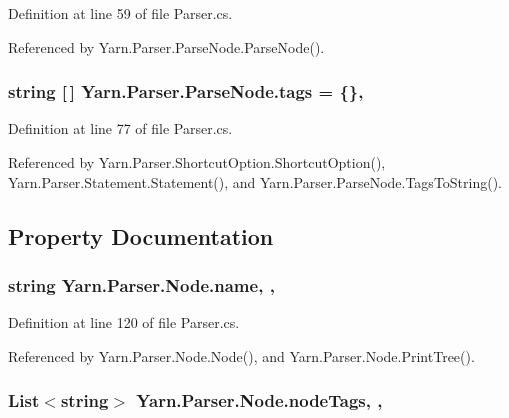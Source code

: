 Definition at line 59 of file Parser.\-cs.



Referenced by Yarn.\-Parser.\-Parse\-Node.\-Parse\-Node().

\hypertarget{a00150_a58b3a15788fd2d4127d73619dc6d04ae}{
\subsubsection[{tags}]{\setlength{\rightskip}{0pt plus 5cm}string \mbox{[}$\,$\mbox{]} Yarn.\-Parser.\-Parse\-Node.\-tags = \{\}\hspace{0.3cm}{\ttfamily [package]}, {\ttfamily [inherited]}}}\label{a00150_a58b3a15788fd2d4127d73619dc6d04ae}


Definition at line 77 of file Parser.\-cs.



Referenced by Yarn.\-Parser.\-Shortcut\-Option.\-Shortcut\-Option(), Yarn.\-Parser.\-Statement.\-Statement(), and Yarn.\-Parser.\-Parse\-Node.\-Tags\-To\-String().



\subsection{Property Documentation}
\hypertarget{a00140_a3cfa07840da3a7a92c820788e902aefb}{
\subsubsection[{name}]{\setlength{\rightskip}{0pt plus 5cm}string Yarn.\-Parser.\-Node.\-name\hspace{0.3cm}{\ttfamily [get]}, {\ttfamily [set]}, {\ttfamily [package]}}}\label{a00140_a3cfa07840da3a7a92c820788e902aefb}


Definition at line 120 of file Parser.\-cs.



Referenced by Yarn.\-Parser.\-Node.\-Node(), and Yarn.\-Parser.\-Node.\-Print\-Tree().

\hypertarget{a00140_a7b1e55929dd7c9b1b0349a70d1787f2a}{
\subsubsection[{node\-Tags}]{\setlength{\rightskip}{0pt plus 5cm}List$<$string$>$ Yarn.\-Parser.\-Node.\-node\-Tags\hspace{0.3cm}{\ttfamily [get]}, {\ttfamily [set]}, {\ttfamily [package]}}}\label{a00140_a7b1e55929dd7c9b1b0349a70d1787f2a}


